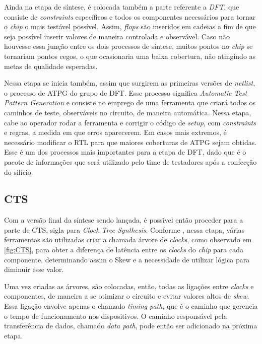 \documentclass[
	12pt,				%
    oneside,			%
	a4paper,			%
	english,			%
	french,				%
	spanish,			%
	brazil				%
	]{abntex2}
\begin{document}
Ainda na etapa de síntese, é colocada também a parte referente a \textit{DFT}, que consiste de \textit{constraints} específicos e todos os componentes necessários para tornar o \textit{chip} o mais testável possível. Assim, \textit{flops} são inseridos em cadeias a fim de que seja possível inserir valores de maneira controlada e observável. Caso não houvesse essa junção entre os dois processos de síntese, muitos pontos no \textit{chip} se tornariam pontos cegos, o que ocasionaria uma baixa cobertura, não atingindo as metas de qualidade esperadas.

Nessa etapa se inicia também, assim que surgirem as primeiras versões de \textit{netlist}, o processo de ATPG do grupo de DFT. Esse processo significa \textit{Automatic Test Pattern Generation} e consiste no emprego de uma ferramenta que criará todos os caminhos de teste, observáveis no circuito, de maneira automática. Nessa etapa, cabe ao operador rodar a ferramenta e corrigir o código de \textit{setup}, com \textit{constraints} e regras, a medida em que erros aparecerem. Em casos mais extremos, é necessário modificar o RTL para que maiores coberturas de ATPG sejam obtidas. Esse é um dos processos mais importantes para a etapa de DFT, dado que é o pacote de informações que será utilizado pelo time de testadores após a confecção do silício.

\subsection{CTS}

Com a versão final da síntese sendo lançada, é possível então proceder para a parte de CTS, sigla para \textit{Clock Tree Synthesis}. Conforme \citeauthor{Laung}, nessa etapa, várias ferramentas são utilizadas criar a chamada árvore de \textit{clocks}, como observado em \ref{fig:CTS}, para obter a diferença de latência entre os \textit{clocks} do \textit{chip} para cada componente, determinando assim o Skew e a necessidade de utilizar lógica para diminuir esse valor.



Uma vez criadas as árvores, são colocadas, então, todas as ligações entre \textit{clocks} e componentes, de maneira a se otimizar o circuito e evitar valores altos de \textit{skew}. Essa ligação envolve apenas o chamado \textit{timing path}, que é o caminho que gerencia o tempo de funcionamento nos dispositivos. O caminho responsável pela transferência de dados, chamado \textit{data path}, pode então ser adicionado na próxima etapa.
\end{document}
